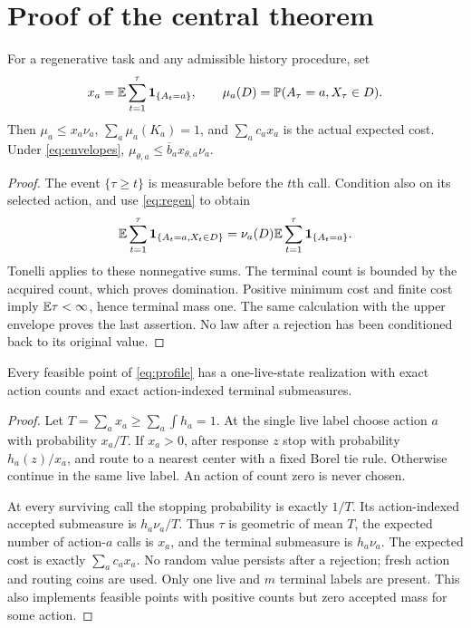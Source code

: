 \section{Proof of the central theorem}\label{sec:proof}
\begin{lemma}\label{lem:mass}
For a regenerative task and any admissible history procedure, set
\[
 x_a=\mathbb E\sum_{t=1}^{\tau}\mathbf1_{\{A_t=a\}},\qquad
 \mu_a(D)=\mathbb P(A_\tau=a,X_\tau\in D).
\]
Then $\mu_a\le x_a\nu_a$, $\sum_a\mu_a(K_a)=1$, and $\sum_a c_ax_a$ is the actual expected cost. Under \eqref{eq:envelopes}, $\mu_{\theta,a}\le\overline b_a x_{\theta,a}\nu_a$.
\end{lemma}
\begin{proof}
The event $\{\tau\ge t\}$ is measurable before the $t$th call. Condition also on its selected action, and use \eqref{eq:regen} to obtain
\[
 \mathbb E\sum_{t=1}^{\tau}\mathbf1_{\{A_t=a,X_t\in D\}}
       =\nu_a(D)\mathbb E\sum_{t=1}^{\tau}\mathbf1_{\{A_t=a\}}.
\]
Tonelli applies to these nonnegative sums. The terminal count is bounded by the acquired count, which proves domination. Positive minimum cost and finite cost imply $\mathbb E\tau<\infty$, hence terminal mass one. The same calculation with the upper envelope proves the last assertion. No law after a rejection has been conditioned back to its original value.
\end{proof}

\begin{lemma}\label{lem:realization}
Every feasible point of \eqref{eq:profile} has a one-live-state realization with exact action counts and exact action-indexed terminal submeasures.
\end{lemma}
\begin{proof}
Let $T=\sum_a x_a\ge\sum_a\int h_a=1$. At the single live label choose action $a$ with probability $x_a/T$. If $x_a>0$, after response $z$ stop with probability $h_a(z)/x_a$, and route to a nearest center with a fixed Borel tie rule. Otherwise continue in the same live label. An action of count zero is never chosen.

At every surviving call the stopping probability is exactly $1/T$. Its action-indexed accepted submeasure is $h_a\nu_a/T$. Thus $\tau$ is geometric of mean $T$, the expected number of action-$a$ calls is $x_a$, and the terminal submeasure is $h_a\nu_a$. The expected cost is exactly $\sum_a c_ax_a$. No random value persists after a rejection; fresh action and routing coins are used. Only one live and $m$ terminal labels are present. This also implements feasible points with positive counts but zero accepted mass for some action.
\end{proof}

